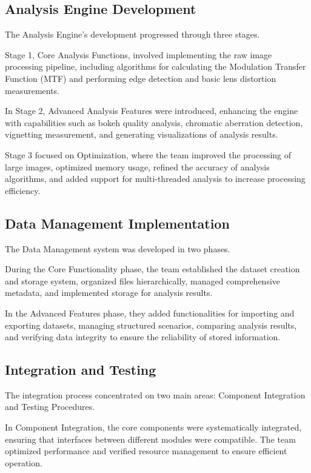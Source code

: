 \subsection{Analysis Engine Development}

The Analysis Engine's development progressed through three stages.

Stage 1, Core Analysis Functions, involved implementing the raw image processing pipeline, including algorithms for calculating the Modulation Transfer Function (MTF) and performing edge detection and basic lens distortion measurements.

In Stage 2, Advanced Analysis Features were introduced, enhancing the engine with capabilities such as bokeh quality analysis, chromatic aberration detection, vignetting measurement, and generating visualizations of analysis results.

Stage 3 focused on Optimization, where the team improved the processing of large images, optimized memory usage, refined the accuracy of analysis algorithms, and added support for multi-threaded analysis to increase processing efficiency.

\subsection{Data Management Implementation}

The Data Management system was developed in two phases.

During the Core Functionality phase, the team established the dataset creation and storage system, organized files hierarchically, managed comprehensive metadata, and implemented storage for analysis results.

In the Advanced Features phase, they added functionalities for importing and exporting datasets, managing structured scenarios, comparing analysis results, and verifying data integrity to ensure the reliability of stored information.

\subsection{Integration and Testing}

The integration process concentrated on two main areas: Component Integration and Testing Procedures.

In Component Integration, the core components were systematically integrated, ensuring that interfaces between different modules were compatible. The team optimized performance and verified resource management to ensure efficient operation.


